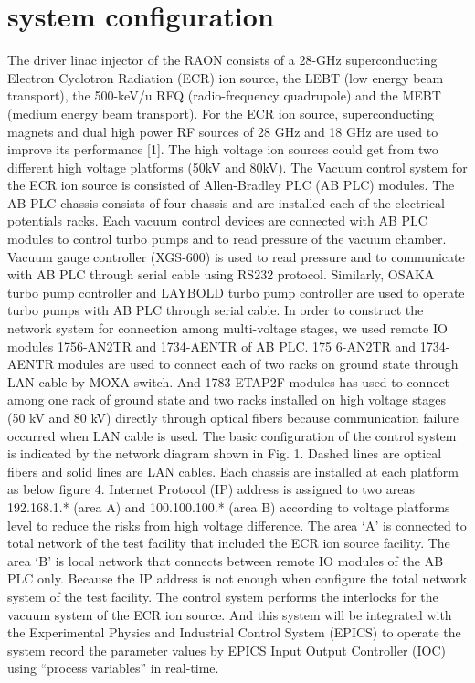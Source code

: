 \documentclass[a4paper,
              ]{jacow}
\begin{document}
\section{system configuration}
The driver linac injector of the RAON consists of a 28-GHz superconducting Electron Cyclotron Radiation (ECR) ion source, the LEBT (low energy beam transport), the 500-keV/u RFQ (radio-frequency quadrupole) and the MEBT (medium energy beam transport). For the ECR ion source, superconducting magnets and dual high power RF sources of 28 GHz and 18 GHz are used to improve its performance [1]. The high voltage ion sources could get from two different high voltage platforms (50kV and 80kV).
The Vacuum control system for the ECR ion source is consisted of Allen-Bradley PLC (AB PLC) modules. The AB PLC chassis consists of four chassis and are installed each of the electrical potentials racks. Each vacuum control devices are connected with AB PLC modules to control turbo pumps and to read pressure of the vacuum chamber. Vacuum gauge controller (XGS-600) is used to read pressure and to communicate with AB PLC through serial cable using RS232 protocol. Similarly, OSAKA turbo pump controller and LAYBOLD turbo pump controller are used to operate turbo pumps with AB PLC through serial cable.
In order to construct the network system for connection among multi-voltage stages, we used remote IO modules 1756-AN2TR and 1734-AENTR of AB PLC. 175 6-AN2TR and 1734-AENTR modules are used to connect each of two racks on ground state through LAN cable by MOXA switch. And 1783-ETAP2F modules has used to connect among one rack of ground state and two racks installed on high voltage stages (50 kV and 80 kV) directly through optical fibers because communication failure occurred when LAN cable is used. The basic configuration of the control system is indicated by the network diagram shown in Fig. 1. Dashed lines are optical fibers and solid lines are LAN cables. Each chassis are installed at each platform as below figure 4.
Internet Protocol (IP) address is assigned to two areas 192.168.1.* (area A) and 100.100.100.* (area B) according to voltage platforms level to reduce the risks from high voltage difference. The area ‘A’ is connected to total network of the test facility that included the ECR ion source facility. The area ‘B’ is local network that connects between remote IO modules of the AB PLC only. Because the IP address is not enough when configure the total network system of the test facility.
The control system performs the interlocks for the vacuum system of the ECR ion source. And this system will be integrated with the Experimental Physics and Industrial Control System (EPICS) to operate the system record the parameter values by EPICS Input Output Controller (IOC) using “process variables” in real-time.
\end{document}
